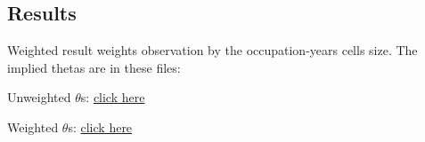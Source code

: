 \documentclass[a4paper, 12pt]{article}
\begin{document}
\subsection{Results}
Weighted result weights observation by the occupation-years cells size. The implied thetas are in these files:
\bitem
\item Unweighted $\theta$s: \href{https://www.dropbox.com/s/epmal84fzmnwiam/unweighted_thetas.txt?dl=0}{click here}
\item Weighted $\theta$s: \href{https://www.dropbox.com/s/bkq8o6zcjmgpjf8/weighted_thetas.txt?dl=0}{click here}
\eitem
\FloatBarrier


\FloatBarrier
%
%
\end{document}
